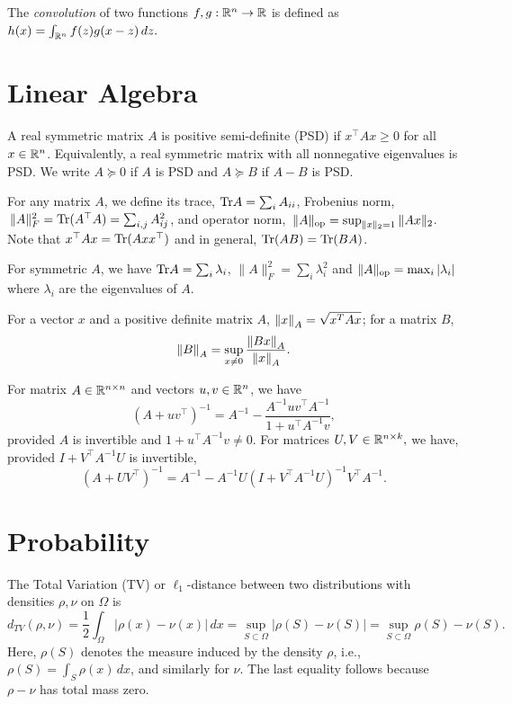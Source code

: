 \begin{defn}
The \emph{convolution} of two functions $f,g:\mathbb{R}^{n}\rightarrow\mathbb{R}$
is defined as $h(x)=\int_{\mathbb{R}^{n}}f(z)g(x-z)\,dz.$
\end{defn}


\section*{Linear Algebra}
\begin{defn}
\label{def:PSD}A real symmetric matrix $A$ is positive semi-definite
(PSD) if $x^{\top}Ax\geq0$ for all $x\in\mathbb{R}^{n}$. Equivalently, a real
symmetric matrix with all nonnegative eigenvalues is PSD. We write
$A\succeq0$ if $A$ is PSD and $A\succeq B$ if $A-B$ is PSD.
\end{defn}

\begin{defn}
For any matrix $A$, we define its trace, $\mathrm{Tr} A=\sum_{i}A_{ii}$,
Frobenius norm, $\,\|A\|^{2}_{F}=\mathrm{Tr}(A^{\top}A)=\sum_{i,j}A^{2}_{ij}$,
and operator norm, $\,\|A\|_{\mathrm{op}}=\sup_{\|x\|_{2}=1}\|Ax\|_{2}$.
Note that $x^{\top}Ax=\mathrm{Tr}(Axx^{\top})$ and in general, $\mathrm{Tr}(AB)=\mathrm{Tr}(BA)$.
\end{defn}

For symmetric $A$, we have $\mathrm{Tr} A=\sum_{i}\lambda_{i}$, $\|A\|^{2}_{F}=\sum_{i}\lambda^{2}_{i}$
and $\|A\|_{\mathrm{op}}=\max_{i}|\lambda_{i}|$ where $\lambda_{i}$ are
the eigenvalues of $A$.

For a vector $x$ and a positive definite matrix $A$, $\left\Vert x\right\Vert_{A}=\sqrt{x^{T}Ax}$;
for a matrix $B$, 
\[
\left\Vert B\right\Vert_{A}=\sup_{x\ne0}\frac{\left\Vert Bx\right\Vert_{A}}{\left\Vert x\right\Vert_{A}}.
\]

\begin{lem}
 For matrix $A\in\mathbb{R}^{n\times n}$ and vectors $u,v\in\mathbb{R}^{n}$, we
have
\[
\left(A+uv^{\top}\right)^{-1}=A^{-1}-\frac{A^{-1}uv^{\top}A^{-1}}{1+u^{\top}A^{-1}v},
\]
provided $A$ is invertible and $1+u^{\top}A^{-1}v\neq0$. For matrices
$U,V\in\mathbb{R}^{n\times k},$ we have, provided $I+V^{\top}A^{-1}U$ is
invertible,
\[
\left(A+UV^{\top}\right)^{-1}=A^{-1}-A^{-1}U\left(I+V^{\top}A^{-1}U\right)^{-1}V^{\top}A^{-1}.
\]
\end{lem}


\section*{Probability}
\begin{defn}
The Total Variation (TV) or $\ell_{1}$-distance between two distributions
with densities $\rho,\nu$ on $\Omega$ is 
\[
d_{TV}(\rho,\nu)=\frac{1}{2}\int_{\Omega}\left|\rho(x)-\nu(x)\right|\,dx=\sup_{S\subset\Omega}\left|\rho(S)-\nu(S)\right|=\sup_{S\subset\Omega}\rho(S)-\nu(S).
\]
Here, $\rho(S)$ denotes the measure induced by the density $\rho$,
i.e., $\rho(S)=\int_{S}\rho(x)\,dx$, and similarly for $\nu$. The
last equality follows because $\rho-\nu$ has total mass zero.
\end{defn}

